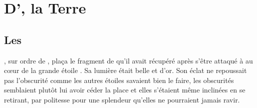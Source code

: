 \chapter{D'\Orba, la Terre}

\section{Les \Vii}

\Carac, sur ordre de \Cind, plaça le fragment de \Drisst qu'il avait récupéré après s'être attaqué à \Shuru au cœur de la grande étoile \Naos. Sa lumière était belle et d'or. Son éclat ne repoussait pas l'obscurité comme les autres étoiles savaient bien le faire, les obscurités semblaient plutôt lui avoir céder la place et elles s'étaient même inclinées en se retirant, par politesse pour une splendeur qu'elles ne pourraient jamais ravir. 